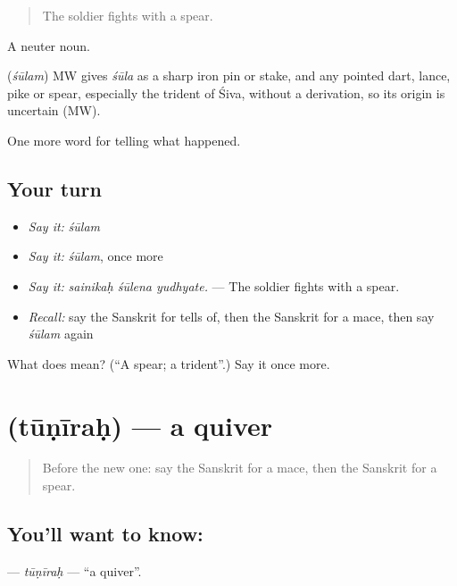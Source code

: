 \begin{quote}
The soldier fights with a spear.
\end{quote}

A neuter noun.

\begin{cousinweb}
\textbf{} (\emph{śūlam}) MW gives \emph{śūla} as a sharp iron pin or stake, and any pointed dart, lance, pike or spear, especially the trident of Śiva, without a derivation, so its origin is uncertain (MW).
\end{cousinweb}

\begin{grammarlens}[title={What you've built}]
One more word for telling what happened.
\end{grammarlens}

\subsection*{Your turn}
\begin{itemize}
\raggedright
  \item \emph{Say it:} \emph{śūlam}
  \item \emph{Say it:} \emph{śūlam}, once more
  \item \emph{Say it:} \emph{sainikaḥ śūlena yudhyate.} — The soldier fights with a spear.
  \item \emph{Recall:} say the Sanskrit for tells of, then the Sanskrit for a mace, then say \emph{śūlam} again
\end{itemize}

\begin{tcolorbox}[breakable,colback=teal!4,colframe=teal!35!black,title={Before you move on}]
What does  mean? (\textquotedblleft{}A spear; a trident\textquotedblright{}.) Say it once more.
\end{tcolorbox}
\section[\texorpdfstring{\sk{तूणीरः} (tūṇīraḥ)}{तूणीरः (tūṇīraḥ)}]{ (tūṇīraḥ) — a quiver}

\label{lesson:SA-C325-tunirah}



\begin{quote}
Before the new one: say the Sanskrit for a mace, then the Sanskrit for a spear.
\end{quote}

\subsection*{You'll want to know: }
\textbf{} — \emph{tūṇīraḥ} — \textquotedblleft{}a quiver\textquotedblright{}.

